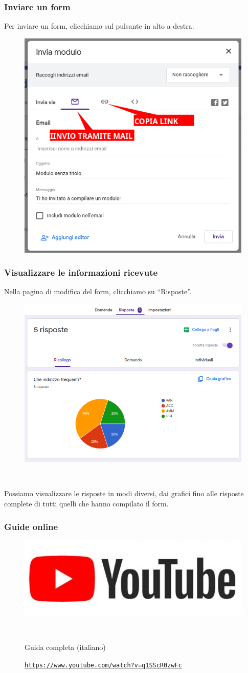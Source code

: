 \documentclass[handout]{beamer}
\begin{document}
\begin{frame}
\frametitle{Inviare un form}
Per inviare un form, clicchiamo sul pulsante in alto a destra.
\begin{figure}
  \includegraphics[width=.5\columnwidth]{img/form5.png}
\end{figure}
\end{frame}






\begin{frame}
\frametitle{Visualizzare le informazioni ricevute}
Nella pagina di modifica del form, clicchiamo su ``Risposte''.

\begin{figure}
  \includegraphics[width=.6\columnwidth]{img/form6.png}
\end{figure}\pause

~

Possiamo visualizzare le risposte in modi diversi, dai grafici fino alle risposte complete di tutti quelli che hanno compilato il form.
\end{frame}




\begin{frame}
\frametitle{Guide online}
\begin{figure}
\includegraphics[width=.5\columnwidth]{img/ytlogo.jpg}

~

Guida completa (italiano)

\href{https://www.youtube.com/watch?v=q1SScR0zwFc}{\texttt{https://www.youtube.com/watch?v=q1SScR0zwFc}}
\end{figure}
\end{frame}
\end{document}
